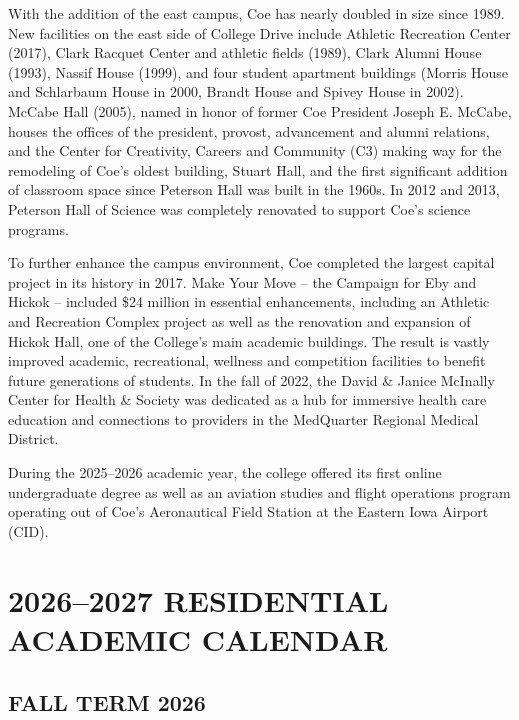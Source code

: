 \documentclass[
  letterpaper,
]{scrbook}
\renewcommand{\part}[1]{\addcontentsline{toc}{part}{#1}}
\begin{document}
With the addition of the east campus, Coe has nearly doubled in size
since 1989. New facilities on the east side of College Drive include
Athletic Recreation Center (2017), Clark Racquet Center and athletic
fields (1989), Clark Alumni House (1993), Nassif House (1999), and four
student apartment buildings (Morris House and Schlarbaum House in 2000,
Brandt House and Spivey House in 2002). McCabe Hall (2005), named in
honor of former Coe President Joseph E. McCabe, houses the offices of
the president, provost, advancement and alumni relations, and the Center
for Creativity, Careers and Community (C3) making way for the remodeling
of Coe's oldest building, Stuart Hall, and the first significant
addition of classroom space since Peterson Hall was built in the 1960s.
In 2012 and 2013, Peterson Hall of Science was completely renovated to
support Coe's science programs.

To further enhance the campus environment, Coe completed the largest
capital project in its history in 2017. Make Your Move -- the Campaign
for Eby and Hickok -- included \$24 million in essential enhancements,
including an Athletic and Recreation Complex project as well as the
renovation and expansion of Hickok Hall, one of the College's main
academic buildings. The result is vastly improved academic,
recreational, wellness and competition facilities to benefit future
generations of students. In the fall of 2022, the David \& Janice
McInally Center for Health \& Society was dedicated as a hub for
immersive health care education and connections to providers in the
MedQuarter Regional Medical District.

During the 2025--2026 academic year, the college offered its first
online undergraduate degree as well as an aviation studies and flight
operations program operating out of Coe's Aeronautical Field Station at
the Eastern Iowa Airport (CID).

\part{ACADEMIC RESOURCES}

\chapter{2026--2027 RESIDENTIAL ACADEMIC
CALENDAR}\label{sec-academic-calendar}

\section{FALL TERM 2026}\label{fall-term-2026}
\end{document}
